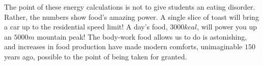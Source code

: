 \documentclass[11pt,letter]{article}
\begin{document}
The point of these energy calculations is not to give students an eating disorder.  Rather, the numbers show food's amazing power. A single slice of toast will bring a car up to the residential speed limit!  A day's food, $3000kcal$, will power you up an $5000m$ mountain peak! The body-work food allows us to do is astonishing, and increases in food production have made modern  comforts, unimaginable $150$ years ago, possible to the point of being taken for granted.  


%
%
\end{document}
